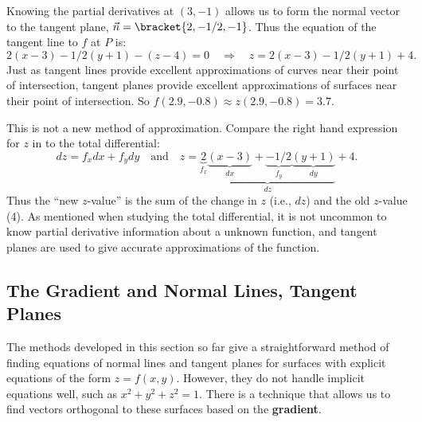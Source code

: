 {Knowing the partial derivatives at $(3,-1)$ allows us to form the normal vector to the tangent plane, $\vec n =\bracket{2,-1/2,-1}$. Thus the equation of the tangent line to $f$ at $P$ is:
\begin{equation}
2(x-3)-1/2(y+1) - (z-4) = 0 \quad \Rightarrow \quad z = 2(x-3)-1/2(y+1)+4.\label{eq:tpl7}\end{equation}
Just as tangent lines provide excellent approximations of curves near their point of intersection, tangent planes provide excellent approximations of surfaces near their point of intersection. So $f(2.9,-0.8) \approx z(2.9,-0.8) = 3.7.$

This is not a new method of approximation. Compare the right hand expression for $z$ in  to the total differential:
$$dz = f_xdx + f_ydy \quad \text{and} \quad z = \underbrace{\underbrace{2}_{f_x}\underbrace{(x-3)}_{dx}
+\underbrace{-1/2}_{f_y}\underbrace{(y+1)}_{dy}}_{dz}+4.$$
Thus the ``new $z$-value'' is the sum of the change in $z$ (i.e., $dz$) and the old $z$-value (4). As mentioned when studying the total differential, it is not uncommon to know partial derivative information about a unknown function, and tangent planes are used to give accurate approximations of the function.}

\subsection*{The Gradient and Normal Lines, Tangent Planes}

The methods developed in this section so far give a straightforward method of finding equations of normal lines and tangent planes for surfaces with explicit equations of the form $z=f(x,y)$. However, they do not handle implicit equations well, such as $x^2+y^2+z^2=1$. There is a technique that allows us to find vectors orthogonal to these surfaces based on the \textbf{gradient}.


